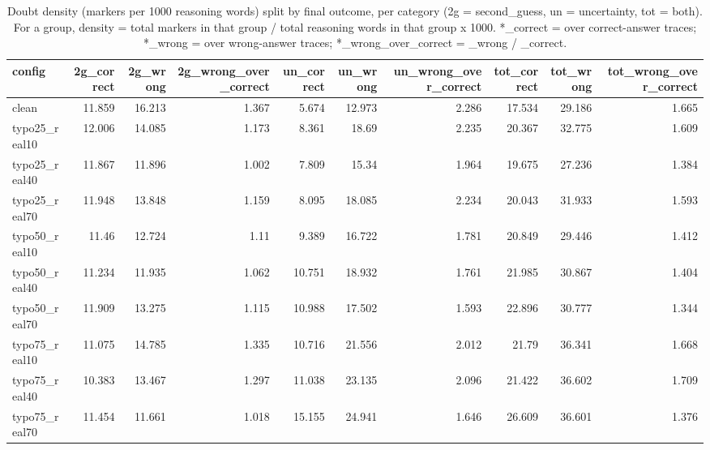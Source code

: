 \documentclass[11pt]{article}
\begin{document}
\begin{table}[H]
\centering
\caption{Doubt density (markers per 1000 reasoning words) split by final outcome, per category (2g = second\_guess, un = uncertainty, tot = both). For a group, density = total markers in that group / total reasoning words in that group x 1000. *\_correct = over correct-answer traces; *\_wrong = over wrong-answer traces; *\_wrong\_over\_correct = \_wrong / \_correct.}
\small
\begin{adjustbox}{max width=\textwidth}
\begin{tabular}{lrrrrrrrrr}
\toprule
\textbf{config} & \textbf{2g\_correct} & \textbf{2g\_wrong} & \textbf{2g\_wrong\_over\_correct} & \textbf{un\_correct} & \textbf{un\_wrong} & \textbf{un\_wrong\_over\_correct} & \textbf{tot\_correct} & \textbf{tot\_wrong} & \textbf{tot\_wrong\_over\_correct} \\
\midrule
clean & 11.859 & 16.213 & 1.367 & 5.674 & 12.973 & 2.286 & 17.534 & 29.186 & 1.665 \\
typo25\_real10 & 12.006 & 14.085 & 1.173 & 8.361 & 18.69 & 2.235 & 20.367 & 32.775 & 1.609 \\
typo25\_real40 & 11.867 & 11.896 & 1.002 & 7.809 & 15.34 & 1.964 & 19.675 & 27.236 & 1.384 \\
typo25\_real70 & 11.948 & 13.848 & 1.159 & 8.095 & 18.085 & 2.234 & 20.043 & 31.933 & 1.593 \\
typo50\_real10 & 11.46 & 12.724 & 1.11 & 9.389 & 16.722 & 1.781 & 20.849 & 29.446 & 1.412 \\
typo50\_real40 & 11.234 & 11.935 & 1.062 & 10.751 & 18.932 & 1.761 & 21.985 & 30.867 & 1.404 \\
typo50\_real70 & 11.909 & 13.275 & 1.115 & 10.988 & 17.502 & 1.593 & 22.896 & 30.777 & 1.344 \\
typo75\_real10 & 11.075 & 14.785 & 1.335 & 10.716 & 21.556 & 2.012 & 21.79 & 36.341 & 1.668 \\
typo75\_real40 & 10.383 & 13.467 & 1.297 & 11.038 & 23.135 & 2.096 & 21.422 & 36.602 & 1.709 \\
typo75\_real70 & 11.454 & 11.661 & 1.018 & 15.155 & 24.941 & 1.646 & 26.609 & 36.601 & 1.376 \\
\bottomrule
\end{tabular}
\end{adjustbox}
\end{table}
\end{document}
